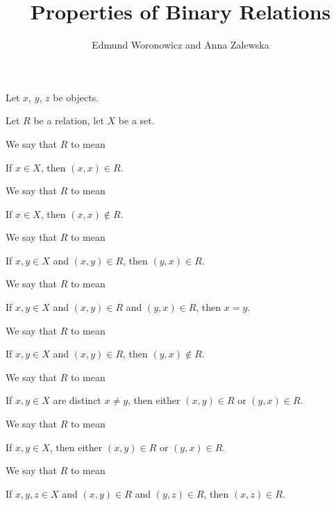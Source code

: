 \documentclass{article}
\title{Properties of Binary Relations}
\author{Edmund Woronowicz and Anna Zalewska}
\begin{document}
\maketitle

Let $x$, $y$, $z$ be objects.

\begin{definition}
Let $R$ be a relation, let $X$ be a set.

We say that $R$  to mean
\begin{defn}
\item If $x\in X$, then $(x,x)\in R$.
\end{defn}
We say that $R$  to mean
\begin{defn}
\item If $x\in X$, then $(x,x)\notin R$.
\end{defn}
We say that $R$  to mean
\begin{defn}
\item If $x,y\in X$ and $(x,y)\in R$, then $(y,x)\in R$.
\end{defn}
We say that $R$  to mean
\begin{defn}
\item If $x,y\in X$ and $(x,y)\in R$ and $(y,x)\in R$, then $x=y$.
\end{defn}
We say that $R$  to mean
\begin{defn}
\item If $x,y\in X$ and $(x,y)\in R$, then $(y,x)\notin R$.
\end{defn}
We say that $R$  to mean
\begin{defn}
\item If $x,y\in X$ are distinct $x\neq y$, then either $(x,y)\in R$ or $(y,x)\in R$.
\end{defn}
We say that $R$  to mean
\begin{defn}
\item If $x,y\in X$, then either $(x,y)\in R$ or $(y,x)\in R$.
\end{defn}
We say that $R$  to mean
\begin{defn}
\item If $x,y,z\in X$ and $(x,y)\in R$ and $(y,z)\in R$, then $(x,z)\in R$.
\end{defn}
\end{definition}
\end{document}
